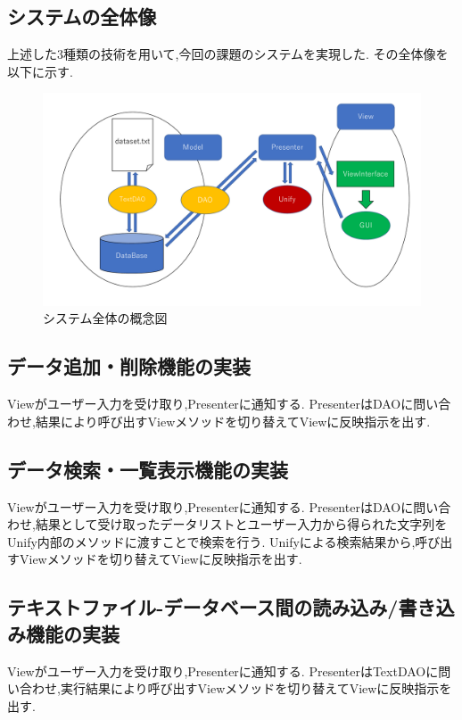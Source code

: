 \documentclass[uplatex,12pt]{jsarticle}
\begin{document}
\subsection{システムの全体像}
上述した3種類の技術を用いて,今回の課題のシステムを実現した.
その全体像を以下に示す.
\begin{figure}[!hbt]
    \centering
    \includegraphics[scale=0.35]{images/architecture_all.pdf}
    \caption{システム全体の概念図}
\end{figure}

\subsection{データ追加・削除機能の実装}
Viewがユーザー入力を受け取り,Presenterに通知する.
PresenterはDAOに問い合わせ,結果により呼び出すViewメソッドを切り替えてViewに反映指示を出す.

\subsection{データ検索・一覧表示機能の実装}
Viewがユーザー入力を受け取り,Presenterに通知する.
PresenterはDAOに問い合わせ,結果として受け取ったデータリストとユーザー入力から得られた文字列をUnify内部のメソッドに渡すことで検索を行う.
Unifyによる検索結果から,呼び出すViewメソッドを切り替えてViewに反映指示を出す.

\subsection{テキストファイル-データベース間の読み込み/書き込み機能の実装}
Viewがユーザー入力を受け取り,Presenterに通知する.
PresenterはTextDAOに問い合わせ,実行結果により呼び出すViewメソッドを切り替えてViewに反映指示を出す.
\end{document}
